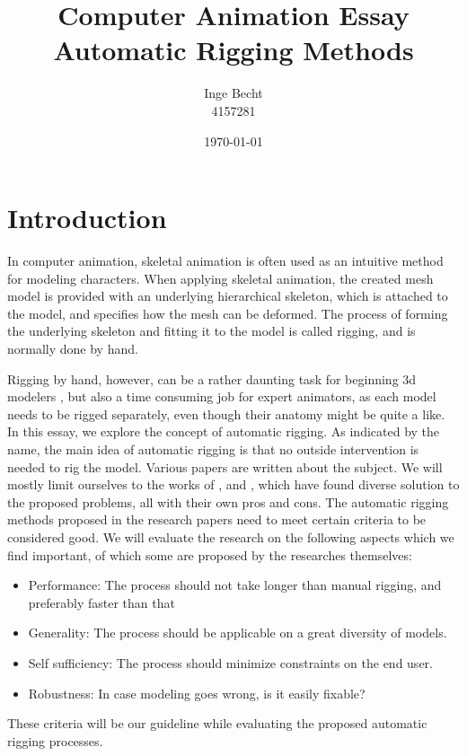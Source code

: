 \documentclass{article}
\title{Computer Animation Essay\\ Automatic Rigging Methods}
\author{Inge Becht\\ 4157281}
\date{\today}
\begin{document}
\maketitle

\section{Introduction}
In computer animation, skeletal animation is often used as an intuitive method
for modeling characters. When applying skeletal animation, the created mesh
model is provided with an underlying hierarchical skeleton, which is attached to
the model, and specifies how the mesh can be deformed. The process of forming
the underlying skeleton and fitting it to the model is called rigging, and is
normally done by hand. 

Rigging by hand, however, can be a rather daunting task for beginning 3d
modelers \citep{paper1}, but also a time consuming job for expert animators, as
each model needs to be rigged separately, even though their anatomy might be
quite a like.
In this essay, we explore the concept of automatic rigging. As indicated by the
name, the main idea of automatic rigging is that no outside intervention is
needed to rig the model.
Various papers are written about the subject. We will mostly limit ourselves to
the works of \citep{paper1}, \citep{paper2} and \citep{paper3}, which have found
diverse solution to the proposed problems, all with their own pros and cons.
The automatic rigging methods proposed in the research papers need to meet
certain criteria to be considered good. We will evaluate the research on the
following aspects which we find important, of which some are proposed by the
researches themselves:

\begin{itemize}
\item Performance: The process should not take longer than manual rigging, and preferably faster than that
\item Generality: The process should be applicable on a great diversity of models.
\item Self sufficiency: The process should minimize constraints on the end user.
\item Robustness: In case modeling goes wrong, is it easily fixable?
\end{itemize}
These criteria will be our guideline while evaluating the proposed automatic rigging processes.
\end{document}
